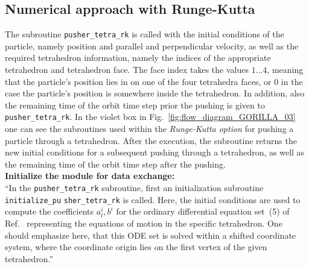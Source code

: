 \documentclass{TheMartianReport}
\begin{document}
\subsection{Numerical approach with Runge-Kutta}
\label{ssec:gorilla_runge_kutta}
%
The subroutine \texttt{pusher\_tetra\_rk} is called with the initial conditions of the particle, namely position and parallel and perpendicular velocity, as well as the required tetrahedron information, namely the indices of the appropriate tetrahedron and tetrahedron face. The face index takes the values $1 \dots 4$, meaning that the particle's position lies in on one of the four tetrahedra faces, or $0$ in the case the particle's position is somewhere inside the tetrahedron.  In addition, also the remaining time of the orbit time step prior the pushing is given to \texttt{pusher\_tetra\_rk}.  In the violet box in Fig.~\ref{fig:flow_diagram_GORILLA_03} one can see the subroutines used within the \textit{Runge-Kutta option} for pushing a particle through a tetrahedron.
After the execution, the subroutine returns the new initial conditions for a subsequent pushing through a tetrahedron, as well as the remaining time of the orbit time step after the pushing. \\
%

\textbf{Initialize the module for data exchange:} \\
``In the \texttt{pusher\_tetra\_rk} subroutine, first an initialization subroutine \texttt{initialize\_pu} \texttt{sher\_tetra\_rk} is called. Here, the initial conditions are used to compute the coefficients $a^i_l, b^i$ for the ordinary differential equation set~(5) of Ref.~ representing the equations of motion in the specific tetrahedron. One should emphasize here, that this ODE set is solved within a shifted coordinate system, where the coordinate origin lies on the first vertex of the given tetrahedron.''\cite{bauer_master_2020}\\
\end{document}

